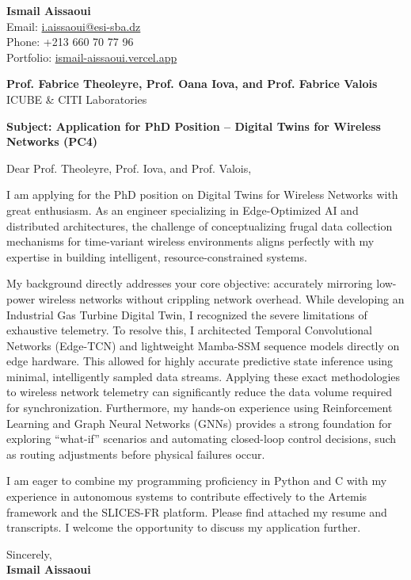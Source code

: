 \documentclass[11pt,a4paper]{article}
\begin{document}
\thispagestyle{empty}

\begin{flushright}
\textbf{Ismail Aissaoui} \\
Email: \href{mailto:i.aissaoui@esi-sba.dz}{i.aissaoui@esi-sba.dz} \\
Phone: +213 660 70 77 96 \\
Portfolio: \href{https://ismail-aissaoui.vercel.app}{ismail-aissaoui.vercel.app}
\end{flushright}

\vspace{1em}

\begin{flushleft}
\textbf{Prof. Fabrice Theoleyre, Prof. Oana Iova, and Prof. Fabrice Valois} \\
ICUBE \& CITI Laboratories
\end{flushleft}

\vspace{1em}
\noindent\textbf{Subject: Application for PhD Position -- Digital Twins for Wireless Networks (PC4)}
\vspace{1em}

\noindent Dear Prof. Theoleyre, Prof. Iova, and Prof. Valois,

\vspace{1em}
\noindent
I am applying for the PhD position on Digital Twins for Wireless Networks with great enthusiasm. As an engineer specializing in Edge-Optimized AI and distributed architectures, the challenge of conceptualizing frugal data collection mechanisms for time-variant wireless environments aligns perfectly with my expertise in building intelligent, resource-constrained systems.

\vspace{0.5em}
\noindent
My background directly addresses your core objective: accurately mirroring low-power wireless networks without crippling network overhead. While developing an Industrial Gas Turbine Digital Twin, I recognized the severe limitations of exhaustive telemetry. To resolve this, I architected Temporal Convolutional Networks (Edge-TCN) and lightweight Mamba-SSM sequence models directly on edge hardware. This allowed for highly accurate predictive state inference using minimal, intelligently sampled data streams. Applying these exact methodologies to wireless network telemetry can significantly reduce the data volume required for synchronization. Furthermore, my hands-on experience using Reinforcement Learning and Graph Neural Networks (GNNs) provides a strong foundation for exploring ``what-if'' scenarios and automating closed-loop control decisions, such as routing adjustments before physical failures occur.

\vspace{0.5em}
\noindent
I am eager to combine my programming proficiency in Python and C with my experience in autonomous systems to contribute effectively to the Artemis framework and the SLICES-FR platform. Please find attached my resume and transcripts. I welcome the opportunity to discuss my application further.

\vspace{1.5em}
\noindent
Sincerely, \\[0.5em]
\textbf{Ismail Aissaoui}
\end{document}
